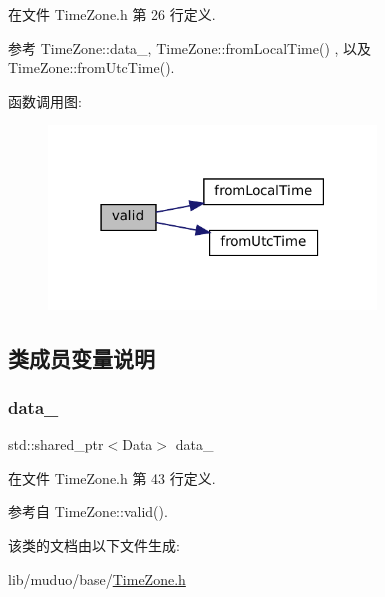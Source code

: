 在文件 Time\+Zone.\+h 第 26 行定义.



参考 Time\+Zone\+::data\+\_\+, Time\+Zone\+::from\+Local\+Time() , 以及 Time\+Zone\+::from\+Utc\+Time().

函数调用图\+:
\nopagebreak
\begin{figure}[H]
\begin{center}
\leavevmode
\includegraphics[width=247pt]{classmuduo_1_1TimeZone_a315419f26d3c59fa143b49b90a019049_cgraph}
\end{center}
\end{figure}


\subsection{类成员变量说明}
\mbox{\label{classmuduo_1_1TimeZone_a49b7ab415f61f3a0b12ed185feb15b9f}} 
\subsubsection{\texorpdfstring{data\+\_\+}{data\_}}
{\footnotesize\ttfamily std\+::shared\+\_\+ptr$<$Data$>$ data\+\_\+\hspace{0.3cm}{\ttfamily [private]}}



在文件 Time\+Zone.\+h 第 43 行定义.



参考自 Time\+Zone\+::valid().



该类的文档由以下文件生成\+:\begin{DoxyCompactItemize}
\item 
lib/muduo/base/\hyperlink{TimeZone_8h}{Time\+Zone.\+h}\end{DoxyCompactItemize}
